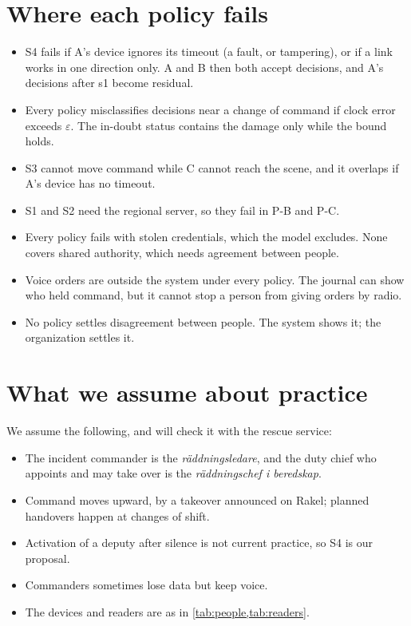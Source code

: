 \documentclass[11pt,a4paper]{article}
\begin{document}
\section{Where each policy fails}
\label{sec:failures}

\begin{itemize}
  \item S4 fails if A's device ignores its timeout (a fault, or tampering), or if a link
        works in one direction only. A and B then both accept decisions, and A's decisions
        after s1 become residual.
  \item Every policy misclassifies decisions near a change of command if clock error exceeds
        $\varepsilon$. The in-doubt status contains the damage only while the bound holds.
  \item S3 cannot move command while C cannot reach the scene, and it overlaps if A's device
        has no timeout.
  \item S1 and S2 need the regional server, so they fail in P-B and P-C.
  \item Every policy fails with stolen credentials, which the model excludes. None covers
        shared authority, which needs agreement between people.
  \item Voice orders are outside the system under every policy. The journal can show who
        held command, but it cannot stop a person from giving orders by radio.
  \item No policy settles disagreement between people. The system shows it; the organization
        settles it.
\end{itemize}

\section{What we assume about practice}
\label{sec:practice}

We assume the following, and will check it with the rescue service:
\begin{itemize}
  \item The incident commander is the \textit{räddningsledare}, and the duty chief who appoints
        and may take over is the \textit{räddningschef i beredskap}.
  \item Command moves upward, by a takeover announced on Rakel; planned handovers happen at
        changes of shift.
  \item Activation of a deputy after silence is not current practice, so S4 is our proposal.
  \item Commanders sometimes lose data but keep voice.
  \item The devices and readers are as in \cref{tab:people,tab:readers}.
\end{itemize}
\end{document}
